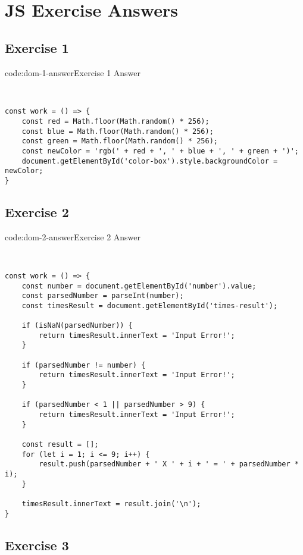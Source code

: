 \section{JS Exercise Answers} \label{sect:js-exercise-answers}

\subsection*{Exercise 1}

\begin{codeenv}{code:dom-1-answer}{Exercise 1 Answer}\begin{verbatim}


const work = () => {
    const red = Math.floor(Math.random() * 256);
    const blue = Math.floor(Math.random() * 256);
    const green = Math.floor(Math.random() * 256);
    const newColor = 'rgb(' + red + ', ' + blue + ', ' + green + ')';
    document.getElementById('color-box').style.backgroundColor = newColor;
}
\end{verbatim}
\end{codeenv}

\subsection*{Exercise 2}

\begin{codeenv}{code:dom-2-answer}{Exercise 2 Answer}\begin{verbatim}


const work = () => {
    const number = document.getElementById('number').value;
    const parsedNumber = parseInt(number);
    const timesResult = document.getElementById('times-result');

    if (isNaN(parsedNumber)) {
        return timesResult.innerText = 'Input Error!';
    }
    
    if (parsedNumber != number) {
        return timesResult.innerText = 'Input Error!';
    }

    if (parsedNumber < 1 || parsedNumber > 9) {
        return timesResult.innerText = 'Input Error!';
    }

    const result = [];
    for (let i = 1; i <= 9; i++) {
        result.push(parsedNumber + ' X ' + i + ' = ' + parsedNumber * i);
    }

    timesResult.innerText = result.join('\n');
}
\end{verbatim}
\end{codeenv}

\subsection*{Exercise 3}


